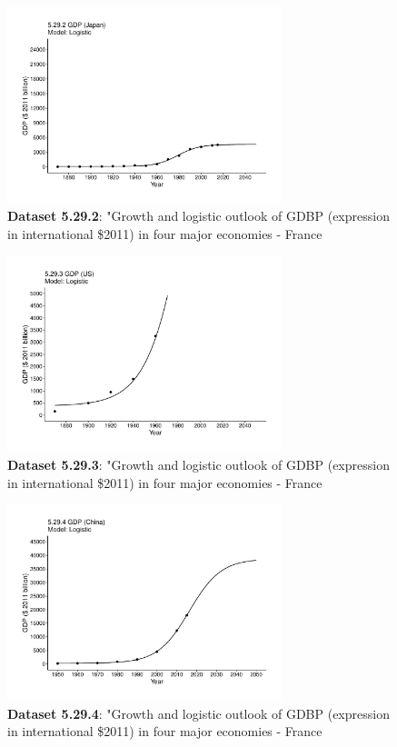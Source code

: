 \documentclass[aps,rmp,preprint,superscriptaddress,10pt,onecolumn]{article}
\begin{document}
\begin{figure}[h]
\includegraphics[width=8cm]{output/figs-ggplot/5.29.2.pdf}
\caption{\textbf{Dataset 5.29.2}: "Growth and logistic outlook of GDBP (expression in international \$2011) in four major economies - France}
\end{figure}
	
\begin{figure}[h]
\includegraphics[width=8cm]{output/figs-ggplot/5.29.3.pdf}
\caption{\textbf{Dataset 5.29.3}: "Growth and logistic outlook of GDBP (expression in international \$2011) in four major economies - France}
\end{figure}
	
\begin{figure}[h]
\includegraphics[width=8cm]{output/figs-ggplot/5.29.4.pdf}
\caption{\textbf{Dataset 5.29.4}: "Growth and logistic outlook of GDBP (expression in international \$2011) in four major economies - France}
\end{figure}
	
\end{document}
